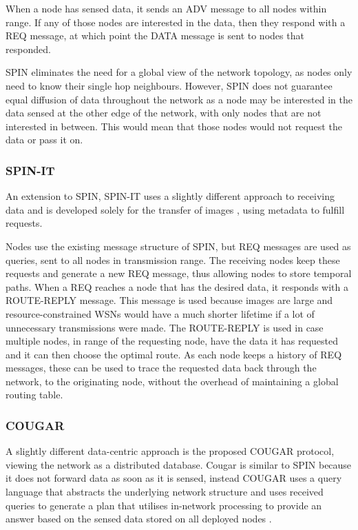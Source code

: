 When a node has sensed data, it sends an ADV message to all nodes within range. If any of those nodes are interested in the data, then they respond with a REQ message, at which point the DATA message is sent to nodes that responded.

SPIN eliminates the need for a global view of the network topology, as nodes only need to know their single hop neighbours. However, SPIN does not guarantee equal diffusion of data throughout the network as a node may be interested in the data sensed at the other edge of the network, with only nodes that are not interested in between. This would mean that those nodes would not request the data or pass it on.

\subsubsection{SPIN-IT}
	An extension to SPIN, SPIN-IT  uses a slightly different approach to receiving data and is developed solely for the transfer of images \cite{Woodrow2002}, using metadata to fulfill requests.
	
Nodes use the existing message structure of SPIN, but REQ messages are used as queries, sent to all nodes in transmission range. The receiving nodes keep these requests and generate a new REQ message, thus allowing nodes to store temporal paths. When a REQ reaches a node that has the desired data, it responds with a ROUTE-REPLY message. This message is used because images are large and resource-constrained WSNs would have a much shorter lifetime if a lot of unnecessary transmissions were made. The ROUTE-REPLY is used in case multiple nodes, in range of the requesting node, have the data it has requested and it can then choose the optimal route. As each node keeps a history of REQ messages, these can be used to trace the requested data back through the network, to the originating node, without the overhead of maintaining a global routing table.

\subsubsection{COUGAR}
	A slightly different data-centric approach is the proposed COUGAR protocol, viewing the network as a distributed database. Cougar is similar to SPIN because it does not forward data as soon as it is sensed, instead COUGAR uses a query language that abstracts the underlying network structure and uses received queries to generate a plan that utilises in-network processing to provide an answer based on the sensed data stored on all deployed nodes \cite{Yao2002}. 

